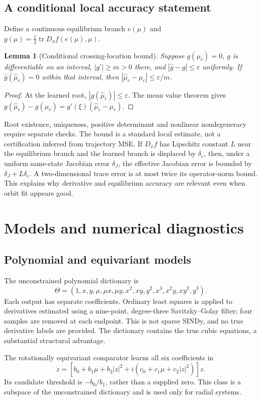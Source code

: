 \documentclass[11pt,a4paper]{article}
\newtheorem{lemma}{Lemma}
\newcommand{\tr}{\operatorname{tr}}
\begin{document}
\subsection{A conditional local accuracy statement}
Define a continuous equilibrium branch $e(\mu)$ and
$g(\mu)=\frac12\tr D_xf(e(\mu),\mu)$.
\begin{lemma}[Conditional crossing-location bound]
Suppose $g(\mu_c)=0$, $g$ is differentiable on an interval, $|g'|\ge m>0$ there, and $|\widehat g-g|\le\varepsilon$ uniformly. If $\widehat g(\widehat\mu_c)=0$ within that interval, then
$|\widehat\mu_c-\mu_c|\le\varepsilon/m$.
\end{lemma}
\begin{proof}
At the learned root, $|g(\widehat\mu_c)|\le\varepsilon$. The mean value theorem gives $g(\widehat\mu_c)-g(\mu_c)=g'(\xi)(\widehat\mu_c-\mu_c)$.
\end{proof}
Root existence, uniqueness, positive determinant and nonlinear nondegeneracy require separate checks. The bound is a standard local estimate, not a certification inferred from trajectory MSE. If $D_xf$ has Lipschitz constant $L$ near the equilibrium branch and the learned branch is displaced by $\delta_e$, then, under a uniform same-state Jacobian error $\delta_J$, the effective Jacobian error is bounded by $\delta_J+L\delta_e$. A two-dimensional trace error is at most twice its operator-norm bound. This explains why derivative and equilibrium accuracy are relevant even when orbit fit appears good.

\section{Models and numerical diagnostics}
\subsection{Polynomial and equivariant models}
The unconstrained polynomial dictionary is
\begin{equation}
\Theta=(1,x,y,\mu,\mu x,\mu y,x^2,xy,y^2,x^3,x^2y,xy^2,y^3).
\end{equation}
Each output has separate coefficients. Ordinary least squares is applied to derivatives estimated using a nine-point, degree-three Savitzky--Golay filter; four samples are removed at each endpoint. This is not sparse SINDy, and no true derivative labels are provided. The dictionary contains the true cubic equations, a substantial structural advantage.

The rotationally equivariant comparator learns all six coefficients in
\begin{equation}
\dot z=[b_0+b_1\mu+b_2|z|^2+i(c_0+c_1\mu+c_2|z|^2)]z.
\end{equation}
Its candidate threshold is $-b_0/b_1$, rather than a supplied zero. This class is a subspace of the unconstrained dictionary and is used only for radial systems.
\end{document}
